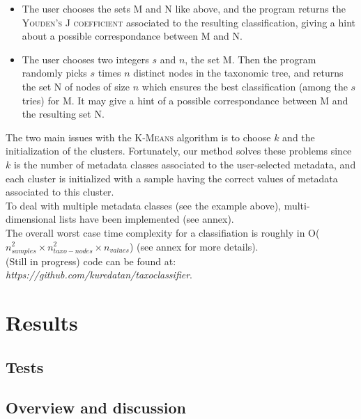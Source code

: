 \documentclass{report}
\begin{document}
\begin{itemize}
\item The user chooses the sets \textsc{M} and \textsc{N} like above, and the program returns the \textsc{Youden’s J coefficient} associated to the resulting classification, giving a hint about a possible correspondance between \textsc{M} and \textsc{N}.
\item The user chooses two integers $s$ and $n$, the set \textsc{M}. Then the program randomly picks $s$ times $n$ distinct nodes in the taxonomic tree, and returns the set \textsc{N} of nodes of size $n$ which ensures the best classification (among the $s$ tries) for M. It may give a hint of a possible correspondance between \textsc{M} and the resulting set \textsc{N}.
\end{itemize}

The two main issues with the \textsc{K-Means} algorithm is to choose $k$ and the initialization of the clusters. Fortunately, our method solves these problems since $k$ is the number of metadata classes associated to the user-selected metadata, and each cluster is initialized with a sample having the correct values of metadata associated to this cluster.\\

To deal with multiple metadata classes (see the example above), multi-dimensional lists have been implemented (see annex).\\

The overall worst case time complexity for a classifiation is roughly in O($n_{samples}^{2} \times n_{taxo-nodes}^{2} \times n_{values}$) (see annex for more details).\\

(Still in progress) code can be found at:\\ \emph{https://github.com/kuredatan/taxoclassifier}.

\section{Results}

\subsection{Tests}


\subsection{Overview and discussion}
\end{document}
